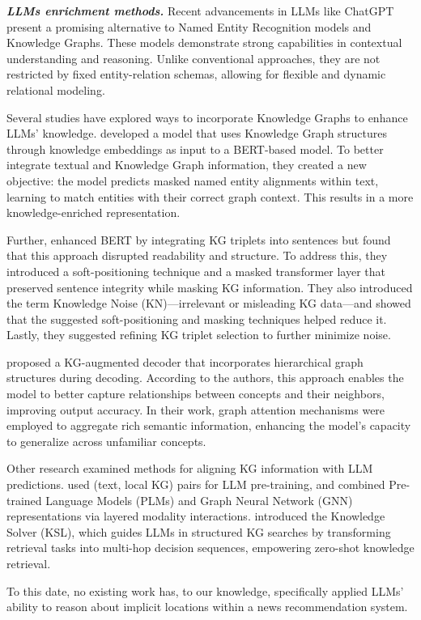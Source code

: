 \textbf{\textit{LLMs enrichment methods.}} Recent advancements in LLMs like ChatGPT \cite{open2023chatgpt, qin2023chatgpt} present a promising alternative to Named Entity Recognition models and Knowledge Graphs. These models demonstrate strong capabilities in contextual understanding and reasoning. Unlike conventional approaches, they are not restricted by fixed entity-relation schemas, allowing for flexible and dynamic relational modeling. 

Several studies have explored ways to incorporate Knowledge Graphs to enhance LLMs' knowledge. \cite{zhang2019ernie} developed a model that uses Knowledge Graph structures through knowledge embeddings \cite{bordes2013translating} as input to a BERT-based model. To better integrate textual and Knowledge Graph information, they created a new objective: the model predicts masked named entity alignments within text, learning to match entities with their correct graph context. This results in a more knowledge-enriched representation.
    
Further, \cite{liu2020k} enhanced BERT by integrating KG triplets into sentences but found that this approach disrupted readability and structure. To address this, they introduced a soft-positioning technique and a masked transformer layer that preserved sentence integrity while masking KG information. They also introduced the term Knowledge Noise (KN)—irrelevant or misleading KG data—and showed that the suggested soft-positioning and masking techniques helped reduce it. Lastly, they suggested refining KG triplet selection to further minimize noise.


\cite{liu2021kg} proposed a KG-augmented decoder that incorporates hierarchical graph structures during decoding. According to the authors, this approach enables the model to better capture relationships between concepts and their neighbors, improving output accuracy. In their work, graph attention mechanisms were employed to aggregate rich semantic information, enhancing the model’s capacity to generalize across unfamiliar concepts.
   
Other research examined methods for aligning KG information with LLM predictions. \cite{yasunaga2022deep} used (text, local KG) pairs for LLM pre-training, and \cite{zhang2022greaselm} combined Pre-trained Language Models (PLMs) and Graph Neural Network (GNN) representations via layered modality interactions. \cite{feng2023knowledge} introduced the Knowledge Solver (KSL), which guides LLMs in structured KG searches by transforming retrieval tasks into multi-hop decision sequences, empowering zero-shot knowledge retrieval.
    
To this date, no existing work has, to our knowledge, specifically applied LLMs' ability to reason about implicit locations within a news recommendation system.